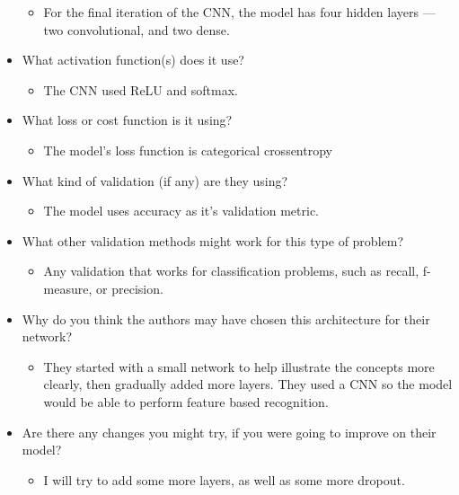 \documentclass[letterpaper]{article}
\begin{document}
\begin{itemize}
\begin{itemize}
\item For the final iteration of the CNN, the model has four hidden layers
--- two convolutional, and two dense.
\end{itemize}

\item What activation function(s) does it use?

\begin{itemize}
\item The CNN used ReLU and softmax.
\end{itemize}

\item What loss or cost function is it using?

\begin{itemize}
\item The model's loss function is categorical crossentropy
\end{itemize}

\item What kind of validation (if any) are they using?

\begin{itemize}
\item The model uses accuracy as it's validation metric.
\end{itemize}

\item What other validation methods might work for this type of problem?

\begin{itemize}
\item Any validation that works for classification problems, such as
recall, f-measure, or precision.
\end{itemize}

\item Why do you think the authors may have chosen this architecture for
their network?

\begin{itemize}
\item They started with a small network to help illustrate the concepts
more clearly, then gradually added more layers. They used a CNN so
the model would be able to perform feature based recognition.
\end{itemize}

\item Are there any changes you might try, if you were going to improve on
their model?

\begin{itemize}
\item I will try to add some more layers, as well as some more dropout.
\end{itemize}
\end{itemize}
\end{document}
